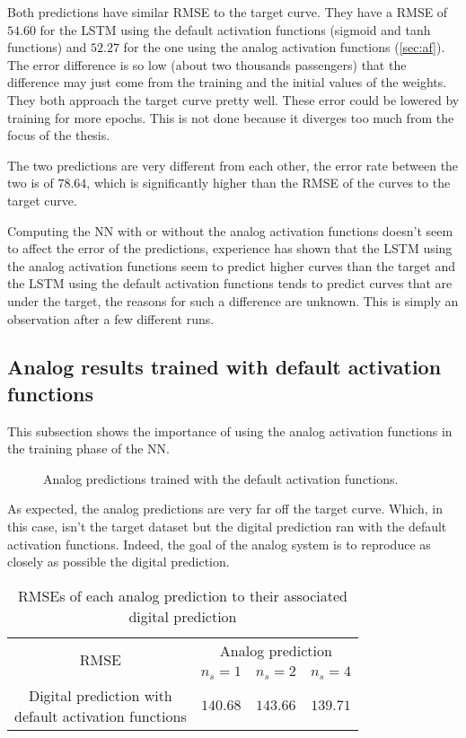 Both predictions have similar \ac{RMSE} to the target curve. They have a \ac{RMSE} of $54.60$ for the \ac{LSTM} using the default activation functions (sigmoid and \ac{tanh} functions) and $52.27$ for the one using the analog activation functions (\cref{sec:af}). The error difference is so low (about two thousands passengers) that the difference may just come from the training and the initial values of the weights. They both approach the target curve pretty well. These error could be lowered by training for more epochs. This is not done because it diverges too much from the focus of the thesis.

The two predictions are very different from each other, the error rate between the two is of $78.64$, which is significantly higher than the \ac{RMSE} of the curves to the target curve.

Computing the \ac{NN} with or without the analog activation functions doesn't seem to affect the error of the predictions, experience has shown that the \ac{LSTM} using the analog activation functions seem to predict higher curves than the target and the \ac{LSTM} using the default activation functions tends to predict curves that are under the target, the reasons for such a difference are unknown. This is simply an observation after a few different runs.

\subsection{Analog results trained with default activation functions}\label{subsec:airlineAnalogNoC}

This subsection shows the importance of using the analog activation functions in the training phase of the \ac{NN}.

\begin{figure}[H]
  \centering
  
  \caption{Analog predictions trained with the default activation functions.}
  \label{graph:airlineAnalogNoC}
\end{figure}

As expected, the analog predictions are very far off the target curve. Which, in this case, isn't the target dataset but the digital prediction ran with the default activation functions. Indeed, the goal of the analog system is to reproduce as closely as possible the digital prediction.

\begin{table}[H]
  \centering
  \begin{tabular}{|c|c|c|c|}
    \hline
    \multirow{2}{*}{\acs{RMSE}} & \multicolumn{3}{|c|}{Analog prediction}\\
    \cline{2-4}
    & $n_s=1$ & $n_s=2$ & $n_s=4$ \\
    \hline
    \specialcell{Digital prediction with\\default activation functions} & $140.68$ & $143.66$ & $139.71$\\
    \hline
  \end{tabular}
  \caption{\acp{RMSE} of each analog prediction to their associated digital prediction}
  \label{tab:airlineAnalogNoC}
\end{table}

